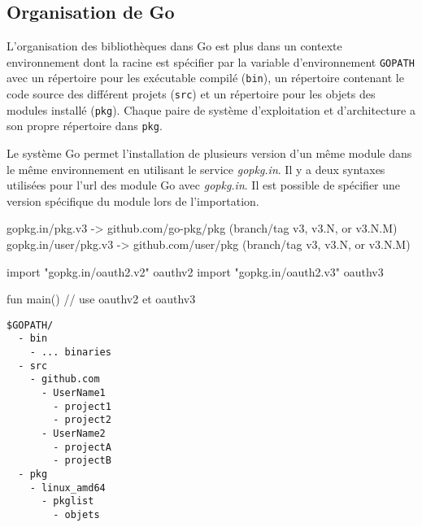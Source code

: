 \subsection{Organisation de Go}
L'organisation des bibliothèques dans Go est plus dans un
contexte environnement dont la racine est spécifier par la variable d'environnement \texttt{GOPATH}
avec un répertoire pour les exécutable compilé (\texttt{bin}),
un répertoire contenant le code source des différent projets (\texttt{src}) et un
répertoire pour les objets des modules installé (\texttt{pkg}). Chaque paire de système
d'exploitation et d'architecture a son propre répertoire dans \texttt{pkg}.

Le système Go permet l'installation de plusieurs version d'un même module dans
le même environnement en utilisant le service \textit{gopkg.in}. Il y a deux
syntaxes utilisées pour l'url des module Go avec \textit{gopkg.in}. Il est possible
de spécifier une version spécifique du module lors de l'importation.

\noindent
\begin{mplisting}{1}
gopkg.in/pkg.v3      -> github.com/go-pkg/pkg (branch/tag v3, v3.N, or v3.N.M)
gopkg.in/user/pkg.v3 -> github.com/user/pkg   (branch/tag v3, v3.N, or v3.N.M)
\end{mplisting}

\begin{mplisting}{1}
import "gopkg.in/oauth2.v2" oauthv2
import "gopkg.in/oauth2.v3" oauthv3

fun main() {
  // use oauthv2 et oauthv3
}
\end{mplisting}


\begin{verbatim}
$GOPATH/
  - bin
    - ... binaries
  - src
    - github.com
      - UserName1
        - project1
        - project2
      - UserName2
        - projectA
        - projectB
  - pkg
    - linux_amd64
      - pkglist
        - objets
\end{verbatim}

